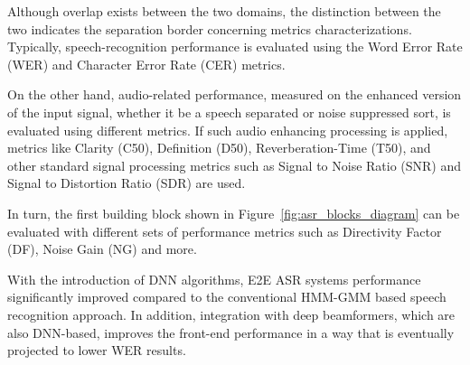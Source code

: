 \bigskip

Although overlap exists between the two domains,
the distinction between the two indicates the separation
border concerning metrics characterizations.
Typically, speech-recognition performance is evaluated
using the Word Error Rate (WER) and
Character Error Rate (CER) metrics.

\medskip

On the other hand, audio-related performance,
measured on the enhanced version of the input signal,
whether it be a speech separated or noise suppressed
sort,
is evaluated using different metrics.
If such audio enhancing processing is applied, metrics
like Clarity (C50), Definition (D50),
Reverberation-Time (T50), and other standard signal processing metrics
such as Signal to Noise Ratio (SNR) and Signal to Distortion Ratio (SDR) are used.






\bigskip

In turn, the first building block shown 
in Figure~\ref{fig:asr_blocks_diagram}
can be evaluated with 
different sets of performance metrics 
such as Directivity Factor (DF),
Noise Gain (NG) and more.

\bigskip

With the introduction of DNN algorithms,
E2E ASR systems performance significantly improved
compared to the conventional HMM-GMM 
based speech recognition approach\cite{7472778, 6296526}.
In addition, integration with deep beamformers,
which are also DNN-based, improves
the front-end performance in a way that is
eventually projected to lower WER results.

